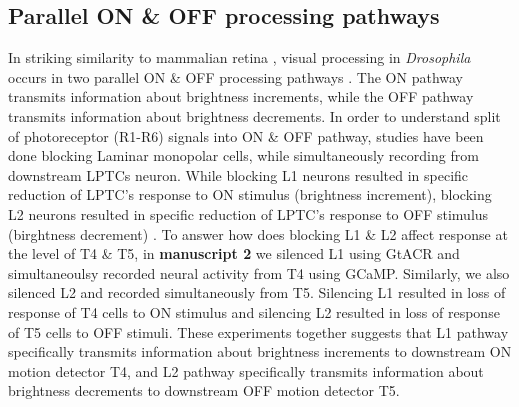 \subsection{Parallel ON \& OFF processing pathways}
In striking similarity to mammalian retina \parencite{Masland2012}, visual processing in \textit{Drosophila} occurs in two parallel ON \& OFF processing pathways \parencite{Borst2015}. The ON pathway transmits information about brightness increments, while the OFF pathway transmits information about brightness decrements. In order to understand split of photoreceptor (R1-R6) signals into ON \& OFF pathway, studies have been done blocking Laminar monopolar cells, while simultaneously recording from downstream LPTCs neuron. While blocking L1 neurons resulted in specific reduction of LPTC's response to ON stimulus (brightness increment), blocking L2 neurons resulted in specific reduction of LPTC's response to OFF stimulus (birghtness decrement) \parencite{Joesch2010}. To answer how does blocking L1 \& L2 affect response at the level of T4 \& T5, in \textbf{manuscript 2} we silenced L1 using GtACR and simultaneoulsy recorded neural activity from T4 using GCaMP. Similarly, we also silenced L2 and recorded simultaneously from T5. Silencing L1 resulted in loss of response of T4 cells to ON stimulus and silencing L2 resulted in loss of response of T5 cells to OFF stimuli. These experiments together suggests that L1 pathway specifically transmits information about brightness increments to downstream ON motion detector T4, and L2 pathway specifically transmits information about brightness decrements to downstream OFF motion detector T5. 

